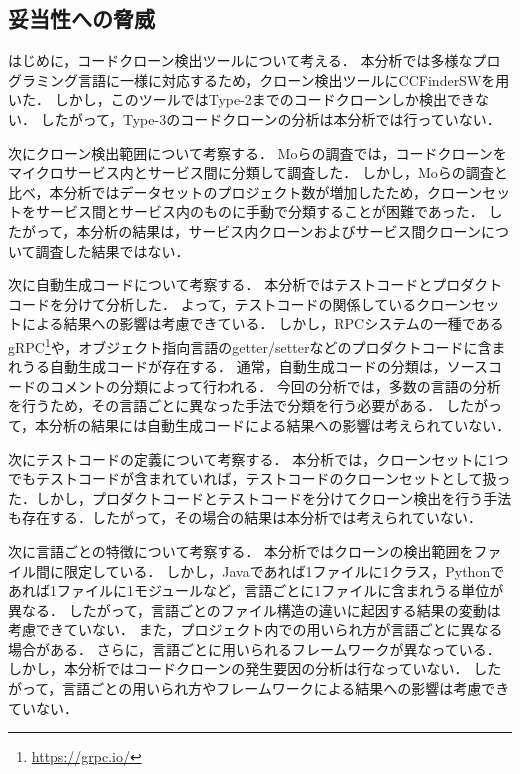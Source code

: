\documentclass[T,J]{fose}
\begin{document}
\subsection{妥当性への脅威}

はじめに，コードクローン検出ツールについて考える．
本分析では多様なプログラミング言語に一様に対応するため，クローン検出ツールにCCFinderSWを用いた．
しかし，このツールではType-2までのコードクローンしか検出できない．
したがって，Type-3のコードクローンの分析は本分析では行っていない．

次にクローン検出範囲について考察する．
Moらの調査では，コードクローンをマイクロサービス内とサービス間に分類して調査した．
しかし，Moらの調査と比べ，本分析ではデータセットのプロジェクト数が増加したため，クローンセットをサービス間とサービス内のものに手動で分類することが困難であった\cite{mo2021existence}．
したがって，本分析の結果は，サービス内クローンおよびサービス間クローンについて調査した結果ではない．

次に自動生成コードについて考察する．
本分析ではテストコードとプロダクトコードを分けて分析した．
よって，テストコードの関係しているクローンセットによる結果への影響は考慮できている．
しかし，RPCシステムの一種であるgRPC\footnote{\url{https://grpc.io/}}や，オブジェクト指向言語のgetter/setterなどのプロダクトコードに含まれうる自動生成コードが存在する．
通常，自動生成コードの分類は，ソースコードのコメントの分類によって行われる．
今回の分析では，多数の言語の分析を行うため，その言語ごとに異なった手法で分類を行う必要がある．
したがって，本分析の結果には自動生成コードによる結果への影響は考えられていない．

次にテストコードの定義について考察する．
本分析では，クローンセットに1つでもテストコードが含まれていれば，テストコードのクローンセットとして扱った．しかし，プロダクトコードとテストコードを分けてクローン検出を行う手法も存在する．したがって，その場合の結果は本分析では考えられていない．

次に言語ごとの特徴について考察する．
本分析ではクローンの検出範囲をファイル間に限定している．
しかし，Javaであれば1ファイルに1クラス，Pythonであれば1ファイルに1モジュールなど，言語ごとに1ファイルに含まれうる単位が異なる．
したがって，言語ごとのファイル構造の違いに起因する結果の変動は考慮できていない．
また，プロジェクト内での用いられ方が言語ごとに異なる場合がある．
さらに，言語ごとに用いられるフレームワークが異なっている．
しかし，本分析ではコードクローンの発生要因の分析は行なっていない．
したがって，言語ごとの用いられ方やフレームワークによる結果への影響は考慮できていない．
\end{document}
